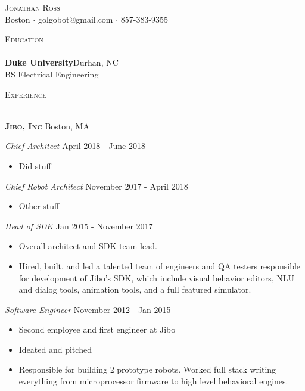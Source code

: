 \documentclass[a4paper]{article}
\newcommand{\lineunder} {
    \vspace*{-8pt} \\
    \hspace*{-18pt} \hrulefill \\
}
\newcommand{\header} [1] {
    {\hspace*{-18pt}\vspace*{6pt} \textsc{#1}}
    \vspace*{-6pt} \lineunder
}
\begin{document}
\vspace*{-40pt}

    

\vspace*{-10pt}
\begin{center}
	{\Huge \scshape {Jonathan Ross}}\\
	Boston $\cdot$ golgobot@gmail.com $\cdot$ 857-383-9355\\
\end{center}

\header{Education}
\textbf{Duke University}\hfill Durhan, NC\\
BS Electrical Engineering\\
\vspace{2mm}

\header{Experience}
\vspace{1mm}

\textbf{\textsc{Jibo, Inc}} \hfill Boston, MA\\
\vspace{2mm}

\begin{addmargin}[1em]{0em}
    \textit{Chief Architect} \hfill April 2018 - June 2018\\
    \vspace{-1mm}
    \begin{itemize} \itemsep 1pt
        \item Did stuff
    \end{itemize}
    \textit{Chief Robot Architect} \hfill November 2017 - April 2018\\
    \vspace{-1mm}
    \begin{itemize} \itemsep 1pt
        \item Other stuff
    \end{itemize}
    \textit{Head of SDK} \hfill Jan 2015 - November 2017\\
    \vspace{-1mm}
    \begin{itemize} \itemsep 1pt
        \item Overall architect and SDK team lead.
        \item Hired, built, and led a talented team of engineers and QA testers 
        responsible for development of Jibo’s SDK, which include visual behavior editors, 
        NLU and dialog tools, animation tools, and a full featured simulator.
    \end{itemize}
    \textit{Software Engineer} \hfill November 2012 - Jan 2015\\
    \vspace{-1mm}
    \begin{itemize} \itemsep 1pt
        \item Second employee and first engineer at Jibo
        \item Ideated and pitched
        \item Responsible for building 2 prototype robots. Worked full stack writing 
        everything from microprocessor firmware to high level behavioral engines.
    \end{itemize}
\end{addmargin}
\end{document}
